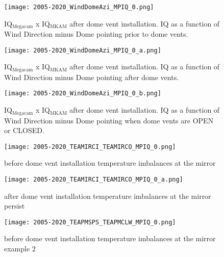 \begin{figure*}
\begin{subfigure}{0.33\textwidth}
    \centering
    \texttt{[image: 2005-2020\_WindDomeAzi\_MPIQ\_0.png]}
    \caption{IQ$_{\textrm{Megacam}}$ x IQ$_{\textrm{MKAM}}$ after dome vent installation. IQ as a function of Wind Direction minus Dome pointing prior to dome vents.}
    \label{fig:my_label}
\end{subfigure}
\begin{subfigure}{0.33\textwidth}
    \centering
    \texttt{[image: 2005-2020\_WindDomeAzi\_MPIQ\_0\_a.png]}
    \caption{IQ$_{\textrm{Megacam}}$ x IQ$_{\textrm{MKAM}}$ after dome vent installation. IQ as a function of Wind Direction minus Dome pointing after dome vents.}
    \label{fig:my_label}
\end{subfigure}
\begin{subfigure}{0.33\textwidth}
    \centering
    \texttt{[image: 2005-2020\_WindDomeAzi\_MPIQ\_0\_b.png]}
    \caption{IQ$_{\textrm{Megacam}}$ x IQ$_{\textrm{MKAM}}$ after dome vent installation. IQ as a function of Wind Direction minus Dome pointing when dome vents are OPEN or CLOSED.}
    \label{fig:my_label}
\end{subfigure}


\begin{subfigure}{0.33\textwidth}
    \centering
    \texttt{[image: 2005-2020\_TEAMIRCI\_TEAMIRCO\_MPIQ\_0.png]}
    \caption{before dome vent installation temperature imbalances at the mirror}
    \label{fig:my_label}
\end{subfigure}
\begin{subfigure}{0.33\textwidth}
    \centering
    \texttt{[image: 2005-2020\_TEAMIRCI\_TEAMIRCO\_MPIQ\_0\_a.png]}
    \caption{after dome vent installation temperature imbalances at the mirror persist}
    \label{fig:my_label}
\end{subfigure}
\begin{subfigure}{0.33\textwidth}
    \centering
    \texttt{[image: 2005-2020\_TEAPMSPS\_TEAPMCLW\_MPIQ\_0.png]}
    \caption{before dome vent installation temperature imbalances at the mirror example 2}
    \label{fig:my_label}
\end{subfigure}



\end{figure*}
